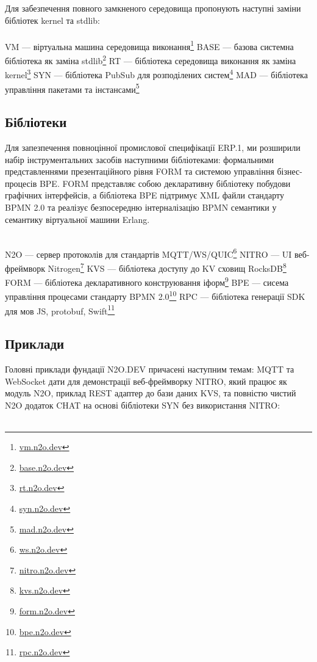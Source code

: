 Для забезпечення повного замкненого середовища пропонують наступні заміни бібліотек kernel та stdlib: \\
\\ \indent
VM --- віртуальна машина середовища виконання\footnote{\url{vm.n2o.dev}}
BASE --- базова системна бібліотека як заміна stdlib\footnote{\url{base.n2o.dev}}
RT --- бібліотека середовища виконання як заміна kernel\footnote{\url{rt.n2o.dev}}
SYN --- бібліотека PubSub для розподілених систем\footnote{\url{syn.n2o.dev}}
MAD --- бібліотека управління пакетами та інстансами\footnote{\url{mad.n2o.dev}}

\newpage
\subsection{Бібліотеки}

Для запезпечення повноцінної промислової специфікації ERP.1, ми розширили
набір інструментальних засобів наступними бібліотеками: формальними представленнями
презентаційного рівня FORM та системою управління бізнес-процесів BPE. FORM представляє
собою декларативну бібліотеку побудови графічних інтерфейсів, а бібліотека BPE
підтримує XML файли стандарту BPMN 2.0 та реалізує безпосередню інтерналізацію
BPMN семантики у семантику віртуальної машини Erlang. \\
\\ \indent

N2O --- сервер протоколів для стандартів MQTT/WS/QUIC\footnote{\url{ws.n2o.dev}}
NITRO --- UI веб-фреймворк Nitrogen\footnote{\url{nitro.n2o.dev}}
KVS --- бібліотека доступу до KV сховищ RocksDB\footnote{\url{kvs.n2o.dev}}
FORM --- бібліотека декларативного конструювання іформ\footnote{\url{form.n2o.dev}}
BPE --- сисема управління процесами стандарту BPMN 2.0\footnote{\url{bpe.n2o.dev}}
RPC --- бібліотека генерації SDK для мов JS, protobuf, Swift\footnote{\url{rpc.n2o.dev}}

\subsection{Приклади}

Головні приклади фундації N2O.DEV причасені наступним темам: MQTT та WebSocket
дати для демонстрації веб-фреймворку NITRO, який працює як модуль N2O, приклад
REST адаптер до бази даних KVS, та повністю чистий N2O додаток CHAT на основі
бібліотеки SYN без використання NITRO:\\
\\ \indent

